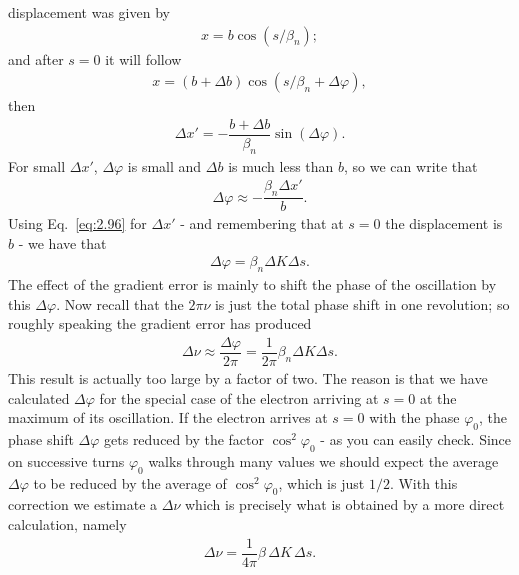 displacement was given by
\begin{align}
	x = b \cos{(s/\beta_n)};
\end{align}
and after $s = 0$ it will follow
\begin{align}
	x = (b + \Delta b) \cos(s/\beta_n+\Delta\varphi),
\end{align}
then
\begin{align}
	\Delta x' = -\dfrac{b+\Delta b}{\beta_n} \sin{\left(\Delta\varphi\right)}.
\end{align}
For small $\Delta x'$, $\Delta \varphi$ is small and $\Delta b$ is much less than $b$, so we can write that
\begin{align}
	\Delta \varphi \approx -\dfrac{\beta_n \Delta x'}{b}.
\end{align}
Using Eq.~\eqref{eq:2.96} for $\Delta x'$ - and remembering that at $s=0$ the displacement is $b$ - we have that
\begin{align}
	\Delta \varphi = \beta_n \Delta K \Delta s.
\end{align}
The effect of the gradient error is mainly to shift the phase of the oscillation by this $\Delta \varphi$. Now recall that the $2\pi\nu$ is just the total phase shift in one revolution; so roughly speaking the gradient error has produced
\begin{align}
	\Delta\nu \approx \dfrac{\Delta\varphi}{2\pi} = \dfrac{1}{2\pi} \beta_n \Delta K \Delta s.
\end{align}
This result is actually too large by a factor of two. The reason is that we have calculated $\Delta \varphi$ for the special case of the electron arriving at $s = 0$ at the maximum
of its oscillation. If the electron arrives at $s = 0$ with the phase $\varphi_0$, the phase
shift $\Delta\varphi$ gets reduced by the factor $\cos^2\varphi_0$ - as you can easily check.
 Since on successive turns $\varphi_0$ walks through many values we should expect the average $\Delta \varphi$ to be reduced by the average of $\cos^2\varphi_0$, which is just $1/2$. With this correction we estimate a $\Delta\nu$ which is precisely what is obtained by a more direct calculation, namely
\begin{align}
	\Delta\nu = \dfrac{1}{4\pi}\beta\, \Delta K\, \Delta s.
\end{align}

